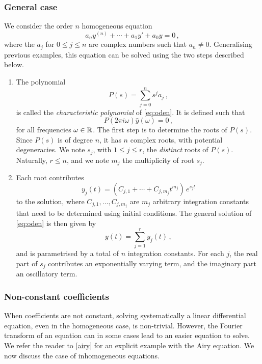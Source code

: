\subsubsection{General case}
We consider the order $n$ homogeneous equation
\begin{equation}
  a_ny^{(n)}+\cdots+a_1y'+a_0y=0\,,\label{eq:oden}
\end{equation}
where the $a_j$ for $0\leq j\leq n$ are complex numbers such that $a_n\neq 0$.
Generalising previous examples, this equation can be solved using the two steps described
below.
\begin{enumerate}
  \item The polynomial
        \begin{equation}
          P(s)=\sum_{j=0}^{n} s^ja_j\,,
        \end{equation}
        is called the \emph{characteristic polynomial} of \cref{eq:oden}. It is defined such
        that
        \begin{equation}
          P(2\pi i\omega)\hat{y}(\omega)=0\,,
        \end{equation}
        for all frequencies $\omega\in\mathbb{R}$. The first step is to determine the roots of $P(s)$.
        Since $P(s)$ is of degree $n$, it has $n$ complex roots, with potential degeneracies.
        We note $s_j$, with $1\leq j\leq r$, the \emph{distinct} roots of $P(s)$. Naturally,
        $r\leq n$, and we note $m_j$ the multiplicity of root $s_j$.
  \item Each root contributes
        \begin{equation}
          y_j(t)=(C_{j,1}+\cdots+C_{j,m_j}t^{m_j})\,e^{s_jt}
        \end{equation}
        to the solution, where $C_{j,1},\dots,C_{j,m_j}$ are $m_j$ arbitrary integration
        constants that need to be determined using initial conditions. The general solution of
        \cref{eq:oden} is then given by
        \begin{equation}
          y(t)=\sum_{j=1}^{r}y_j(t)\,,
        \end{equation}
        and is parametrised by a total of $n$ integration constants. For each $j$, the real
        part of $s_j$ contributes an exponentially varying term, and the imaginary part an
        oscillatory term.
\end{enumerate}
\subsubsection{Non-constant coefficients}
When coefficients are not constant, solving systematically a linear differential
equation, even in the homogeneous case, is non-trivial. However, the Fourier transform of
an equation can in some cases lead to an easier equation to solve. We refer the reader to
\cref{airy} for an explicit example with the Airy equation. We now discuss the case of
inhomogeneous equations.
